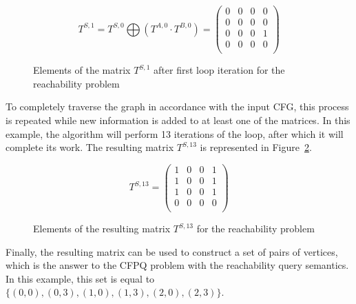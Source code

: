 \begin{figure}[h]
\[
T^{S,1} = T^{S, 0} \bigoplus (T^{A, 0} \cdot T^{B, 0}) = \begin{pmatrix}
	0 & 0     & 0 & 0       \\
	0 & 0 & 0  & 0 \\
	0       & 0 & 0 & 1 \\
	0       & 0 & 0& 0\\
\end{pmatrix}
\]
\caption{Elements of the matrix $T^{S, 1}$ after first loop iteration for the reachability problem}
\label{ExampleQueryFirstIteration}
\end{figure}

To completely traverse the graph in accordance with the input CFG, this process is repeated while new information is added to at least one of the matrices. In this example, the algorithm will perform 13 iterations of the loop, after which it will complete its work. The resulting matrix $T^{S, 13}$ is represented in Figure~\ref{ExampleQueryFinalMatrices}.

{\footnotesize
\begin{figure}[h]
	\[
	T^{S, 13} = \begin{pmatrix}
	1 & 0     & 0 & 1       \\
	1 & 0 & 0   & 1 \\
	1       & 0 & 0 & 1 \\
	0       & 0 & 0 & 0 \\
	\end{pmatrix}
	\]
	\caption{Elements of the resulting matrix $T^{S, 13}$ for the reachability problem}
	\label{ExampleQueryFinalMatrices}
\end{figure}
}

Finally, the resulting matrix can be used to construct a set of pairs of vertices, which is the answer to the CFPQ problem with the reachability query semantics. In this example, this set is equal to $\{(0, 0), (0, 3), (1, 0), (1, 3), (2, 0), (2, 3)\}$.


